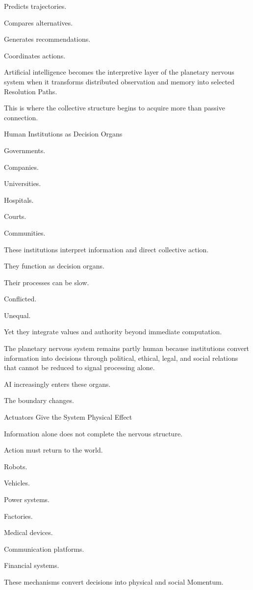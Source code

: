Predicts trajectories.

Compares alternatives.

Generates recommendations.

Coordinates actions.

Artificial intelligence becomes the interpretive layer of the planetary nervous system when it transforms distributed observation and memory into selected Resolution Paths.

This is where the collective structure begins to acquire more than passive connection.

Human Institutions as Decision Organs

Governments.

Companies.

Universities.

Hospitals.

Courts.

Communities.

These institutions interpret information and direct collective action.

They function as decision organs.

Their processes can be slow.

Conflicted.

Unequal.

Yet they integrate values and authority beyond immediate computation.

The planetary nervous system remains partly human because institutions convert information into decisions through political, ethical, legal, and social relations that cannot be reduced to signal processing alone.

AI increasingly enters these organs.

The boundary changes.

Actuators Give the System Physical Effect

Information alone does not complete the nervous structure.

Action must return to the world.

Robots.

Vehicles.

Power systems.

Factories.

Medical devices.

Communication platforms.

Financial systems.

These mechanisms convert decisions into physical and social Momentum.

